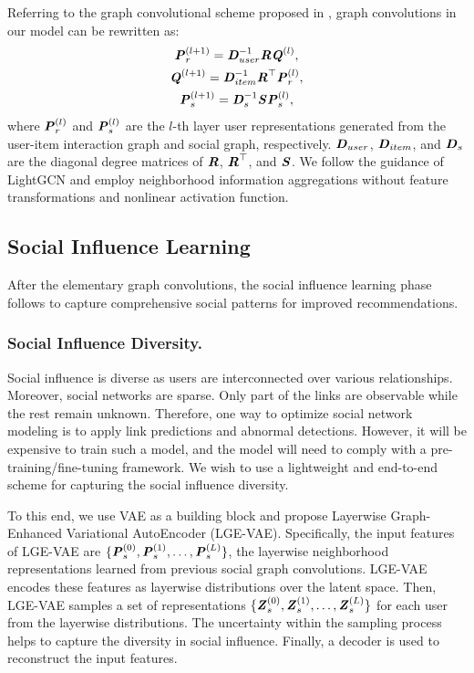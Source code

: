 \documentclass[letterpaper]{article} %
\begin{document}
Referring to the graph convolutional scheme proposed in \cite{GNN}, graph convolutions in our model can be rewritten as:
\begin{gather}
    \textbf{\textit{P}}^{(l+1)}_{r} = \textbf{\textit{D}}^{-1}_{user}\textbf{\textit{R}}\textbf{\textit{Q}}^{(l)},\\
    \textbf{\textit{Q}}^{(l+1)} = \textbf{\textit{D}}^{-1}_{item}\textbf{\textit{R}}^{\top}\textbf{\textit{P}}^{(l)}_{r},\\
    \textbf{\textit{P}}^{(l+1)}_{s} = \textbf{\textit{D}}^{-1}_{s}\textbf{\textit{S}}\textbf{\textit{P}}^{(l)}_{s},
\end{gather}
where $\textbf{\textit{P}}^{(l)}_{r}$ and $\textbf{\textit{P}}^{(l)}_{s}$ are the $l$-th layer user representations generated from the user-item interaction graph and social graph, respectively. $\textbf{\textit{D}}_{user}$, $\textbf{\textit{D}}_{item}$, and $\textbf{\textit{D}}_{s}$ are the diagonal degree matrices of $\textbf{\textit{R}}$, $\textbf{\textit{R}}^{\top}$, and $\textbf{\textit{S}}$. We follow the guidance of LightGCN \cite{lightgcn} and employ neighborhood information aggregations without feature transformations and nonlinear activation function. 

\subsection{Social Influence Learning}
After the elementary graph convolutions, the social influence learning phase follows to capture comprehensive social patterns for improved recommendations.
\subsubsection{Social Influence Diversity.}
Social influence is diverse as users are interconnected over various relationships. Moreover, social networks are sparse. Only part of the links are observable while the rest remain unknown. Therefore, one way to optimize social network modeling is to apply link predictions and abnormal detections. However, it will be expensive to train such a model, and the model will need to comply with a pre-training/fine-tuning framework. We wish to use a lightweight and end-to-end scheme for capturing the social influence diversity. 

To this end, we use VAE \cite{VAE} as a building block and propose Layerwise Graph-Enhanced Variational AutoEncoder (LGE-VAE). Specifically, the input features of LGE-VAE are $\{\textbf{\textit{P}}^{(0)}_{s}, \textbf{\textit{P}}^{(1)}_{s}, \ldots, \textbf{\textit{P}}^{(L)}_{s}\}$, the layerwise neighborhood representations learned from previous social graph convolutions. LGE-VAE encodes these features as layerwise distributions over the latent space. Then, LGE-VAE samples a set of representations $\{\textbf{\textit{Z}}_s^{(0)}, \textbf{\textit{Z}}_s^{(1)}, \ldots, \textbf{\textit{Z}}_s^{(L)}\}$ for each user from the layerwise distributions. The uncertainty within the sampling process helps to capture the diversity in social influence. Finally, a decoder is used to reconstruct the input features. 
\end{document}
